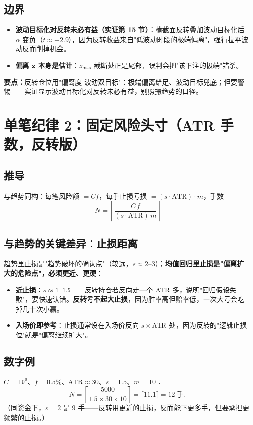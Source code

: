 \documentclass[UTF8,11pt]{ctexart}
\newcommand{\takeaway}[1]{\medskip\par\noindent\textbf{要点：}#1\par\medskip}
\begin{document}
\subsection{边界}
\begin{itemize}[itemsep=2pt]
\item \textbf{波动目标化对反转未必有益（实证第 15 节）}：横截面反转叠加波动目标化后 $\alpha$ 变负（$t\approx-2.9$），因为反转收益来自"低波动时段的极端偏离"，强行拉平波动反而削掉机会。
\item \textbf{偏离 z 本身是估计}：$z_{\max}$ 截断处正是尾部，误判会把"该下注的极端"错杀。
\end{itemize}

\takeaway{反转仓位用"偏离度-波动双目标"：极端偏离给足、波动目标兜底；但要警惕——实证显示波动目标化对反转未必有益，别照搬趋势的口径。}

\section{单笔纪律 2：固定风险头寸（ATR 手数，反转版）}
\subsection{推导}
与趋势同构：每笔风险额 $=Cf$，每手止损亏损 $=(s\cdot\text{ATR})\cdot m$，手数
\begin{equation}
\boxed{\; N=\left\lceil \frac{C\,f}{(s\cdot\text{ATR})\,m}\right\rceil }
\end{equation}
\subsection{与趋势的关键差异：止损距离}
趋势里止损是"趋势破坏的确认点"（较远，$s\approx2$--$3$）；\textbf{均值回归里止损是"偏离扩大的危险点"，必须更近、更硬}：
\begin{itemize}[itemsep=2pt]
\item \textbf{近止损}：$s\approx1$--$1.5$——反转持仓若反向走一个 ATR 多，说明"回归假设失败"，要快速认错。\textbf{反转亏不起大止损}，因为胜率高但赔率低，一次大亏会吃掉几十次小赢。
\item \textbf{入场价即参考}：止损通常设在入场价反向 $s\times$ATR 处，因为反转的"逻辑止损位"就是"偏离继续扩大"。
\end{itemize}
\subsection{数字例}
$C=10^6$、$f=0.5\%$、ATR$\approx30$、$s=1.5$、$m=10$：
\begin{equation}
N=\left\lceil\frac{5000}{1.5\times30\times10}\right\rceil=\lceil 11.1\rceil = 12\ \text{手}.
\end{equation}
（同资金下，$s=2$ 是 9 手——反转用更近的止损，反而能下更多手，但要承担更频繁的止损。）
\end{document}
